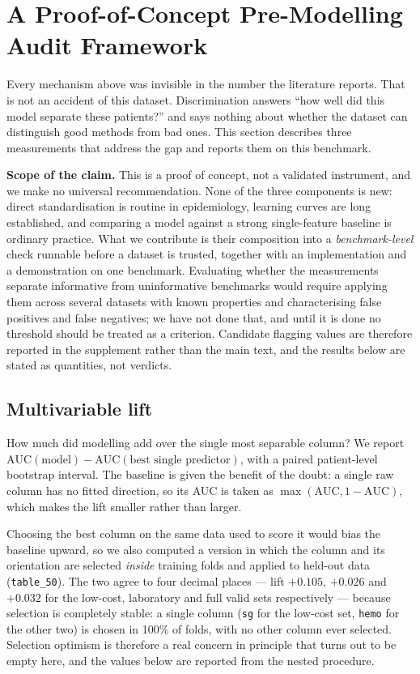 \documentclass[conference]{IEEEtran}
\begin{document}
\section{A Proof-of-Concept Pre-Modelling Audit Framework}
\label{sec:bid}

Every mechanism above was invisible in the number the literature reports.
That is not an accident of this dataset. Discrimination answers ``how well
did this model separate these patients?'' and says nothing about whether the
dataset can distinguish good methods from bad ones. This section describes
three measurements that address the gap and reports them on this benchmark.

\textbf{Scope of the claim.} This is a proof of concept, not a validated
instrument, and we make no universal recommendation. None of the three
components is new: direct standardisation is routine in epidemiology,
learning curves are long established, and comparing a model against a strong
single-feature baseline is ordinary practice. What we contribute is their
composition into a \emph{benchmark-level} check runnable before a dataset is
trusted, together with an implementation and a demonstration on one
benchmark. Evaluating whether the measurements separate informative from
uninformative benchmarks would require applying them across several datasets
with known properties and characterising false positives and false negatives;
we have not done that, and until it is done no threshold should be treated as
a criterion. Candidate flagging values are therefore reported in the
supplement rather than the main text, and the results below are stated as
quantities, not verdicts.

\subsection{Multivariable lift}

How much did modelling add over the single most separable column? We report
$\mathrm{AUC}(\text{model}) - \mathrm{AUC}(\text{best single predictor})$,
with a paired patient-level bootstrap interval. The baseline is given the
benefit of the doubt: a single raw column has no fitted direction, so its AUC
is taken as $\max(\mathrm{AUC}, 1-\mathrm{AUC})$, which makes the lift
smaller rather than larger.

Choosing the best column on the same data used to score it would bias the
baseline upward, so we also computed a version in which the column and its
orientation are selected \emph{inside} training folds and applied to held-out
data (\texttt{table\_50}). The two agree to four decimal places --- lift
$+0.105$, $+0.026$ and $+0.032$ for the low-cost, laboratory and full valid
sets respectively --- because selection is completely stable: a single column
(\texttt{sg} for the low-cost set, \texttt{hemo} for the other two) is chosen
in 100\% of folds, with no other column ever selected. Selection optimism is
therefore a real concern in principle that turns out to be empty here, and
the values below are reported from the nested procedure.
\end{document}
